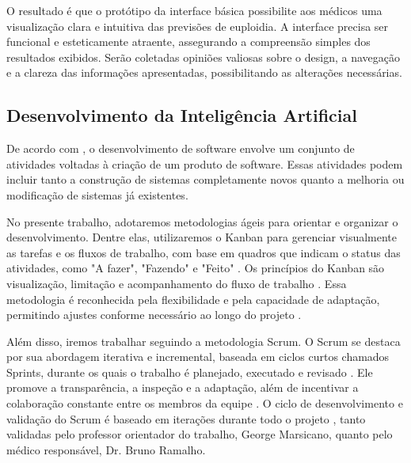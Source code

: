 O resultado é que o protótipo da interface básica possibilite aos médicos uma visualização clara e intuitiva das previsões de euploidia. A interface precisa ser funcional e esteticamente atraente, assegurando a compreensão simples dos resultados exibidos. Serão coletadas opiniões valiosas sobre o design, a navegação e a clareza das informações apresentadas, possibilitando as alterações necessárias.

\subsection{Desenvolvimento da Inteligência Artificial}

De acordo com , o desenvolvimento de software envolve um conjunto de atividades voltadas à criação de um produto de software. Essas atividades podem incluir tanto a construção de sistemas completamente novos quanto a melhoria ou modificação de sistemas já existentes.

No presente trabalho, adotaremos metodologias ágeis para orientar e organizar o desenvolvimento. Dentre elas, utilizaremos o Kanban para gerenciar visualmente as tarefas e os fluxos de trabalho, com base em quadros que indicam o status das atividades, como "A fazer", "Fazendo" e "Feito" \cite{kniberg2010}. Os princípios do Kanban são visualização, limitação e acompanhamento do fluxo de trabalho \cite{kniberg2010}. Essa metodologia é reconhecida pela flexibilidade e pela capacidade de adaptação, permitindo ajustes conforme necessário ao longo do projeto \cite{kniberg2010}.

Além disso, iremos trabalhar seguindo a metodologia Scrum. O Scrum se destaca por sua abordagem iterativa e incremental, baseada em ciclos curtos chamados Sprints, durante os quais o trabalho é planejado, executado e revisado \cite{schwaber2010}. Ele promove a transparência, a inspeção e a adaptação, além de incentivar a colaboração constante entre os membros da equipe \cite{schwaber2010}. O ciclo de desenvolvimento e validação do Scrum é baseado em iterações durante todo o projeto \cite{schwaber2010}, tanto validadas pelo professor orientador do trabalho, George Marsicano, quanto pelo médico responsável, Dr. Bruno Ramalho.
